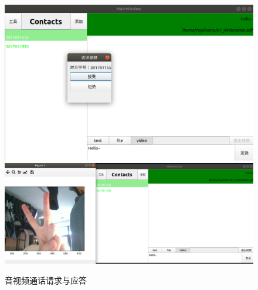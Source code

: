 \documentclass[UTF8]{ctexart}
\begin{document}
\begin{figure}[H]
    \centering
    \includegraphics[scale=0.3]{videocallreq.png}
    \includegraphics[scale=0.18]{videocall.png}
    \caption{音视频通话请求与应答}
\end{figure}
\end{document}
